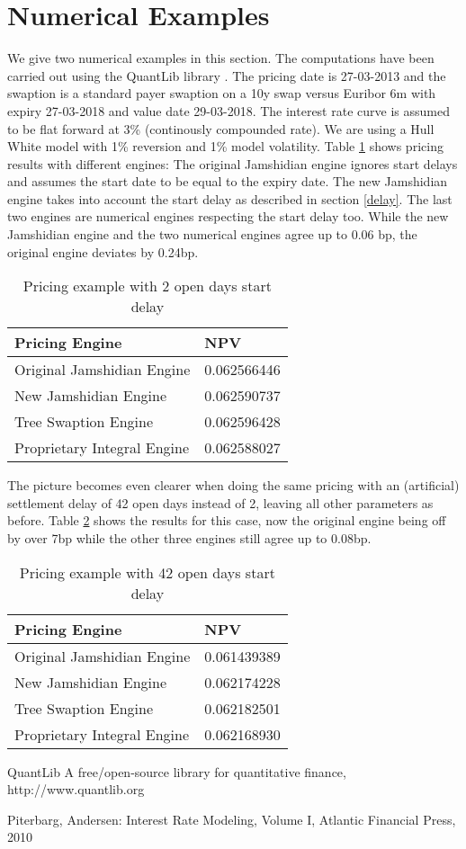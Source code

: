 \documentclass{amsart}
\theoremstyle{plain}
\numberwithin{equation}{section}
\begin{document}
\section{Numerical Examples}\label{numerical}

We give two numerical examples in this section. The computations have been carried out using the QuantLib library \cite{ql}. The pricing date is 27-03-2013 and the swaption is a standard payer swaption on a 10y swap versus Euribor 6m with expiry 27-03-2018 and value date 29-03-2018. The interest rate curve is assumed to be flat forward at 3\% (continously compounded rate). We are using a Hull White model with 1\% reversion and 1\% model volatility. Table \ref{ex1} shows pricing results with different engines: The original Jamshidian engine ignores start delays and assumes the start date to be equal to the expiry date. The new Jamshidian engine takes into account the start delay as described in section \ref{delay}. The last two engines are numerical engines respecting the start delay too. While the new Jamshidian engine and the two numerical engines agree up to 0.06 bp, the original engine deviates by 0.24bp.

\begin{table}[ht]
\caption{Pricing example with 2 open days start delay}
\begin{tabular}{l | l}
Pricing Engine & NPV \\ \hline
Original Jamshidian Engine & 0.062566446 \\
New Jamshidian Engine & 0.062590737  \\
Tree Swaption Engine & 0.062596428 \\
Proprietary Integral Engine & 0.062588027 \\
\end{tabular}
\label{ex1}
\end{table}

The picture becomes even clearer when doing the same pricing with an (artificial) settlement delay of 42 open days instead of 2, leaving all other parameters as before. Table \ref{ex2} shows the results for this case, now the original engine being off by over 7bp while the other three engines still agree up to 0.08bp.

\begin{table}[ht]
\caption{Pricing example with 42 open days start delay}
\begin{tabular}{l | l}
Pricing Engine & NPV \\ \hline
Original Jamshidian Engine & 0.061439389 \\
New Jamshidian Engine & 0.062174228  \\
Tree Swaption Engine & 0.062182501 \\
Proprietary Integral Engine & 0.062168930 \\
\end{tabular}
\label{ex2}
\end{table}

\begin{thebibliography}{3}

QuantLib A free/open-source library for quantitative finance, http://www.quantlib.org

 Piterbarg, Andersen: Interest Rate Modeling, Volume I, Atlantic Financial Press, 2010

\end{thebibliography}
\end{document}
